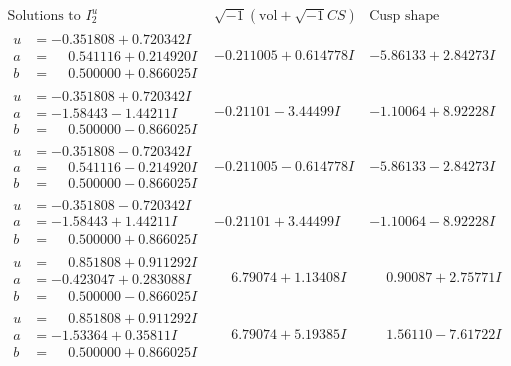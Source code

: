 \documentclass[1p]{elsarticle_modified}
\theoremstyle{definition}
\newcommand{\I}{\sqrt{-1}}
\begin{document}
$$\begin{array}{c|c|c}  
\text{Solutions to }I^u_{2}& \I (\text{vol} + \sqrt{-1}CS) & \text{Cusp shape}\\
 \hline 
\begin{aligned}
u &= -0.351808 + 0.720342 I \\
a &= \phantom{-}0.541116 + 0.214920 I \\
b &= \phantom{-}0.500000 + 0.866025 I\end{aligned}
 & -0.211005 + 0.614778 I & -5.86133 + 2.84273 I \\ \hline\begin{aligned}
u &= -0.351808 + 0.720342 I \\
a &= -1.58443 - 1.44211 I \\
b &= \phantom{-}0.500000 - 0.866025 I\end{aligned}
 & -0.21101 - 3.44499 I & -1.10064 + 8.92228 I \\ \hline\begin{aligned}
u &= -0.351808 - 0.720342 I \\
a &= \phantom{-}0.541116 - 0.214920 I \\
b &= \phantom{-}0.500000 - 0.866025 I\end{aligned}
 & -0.211005 - 0.614778 I & -5.86133 - 2.84273 I \\ \hline\begin{aligned}
u &= -0.351808 - 0.720342 I \\
a &= -1.58443 + 1.44211 I \\
b &= \phantom{-}0.500000 + 0.866025 I\end{aligned}
 & -0.21101 + 3.44499 I & -1.10064 - 8.92228 I \\ \hline\begin{aligned}
u &= \phantom{-}0.851808 + 0.911292 I \\
a &= -0.423047 + 0.283088 I \\
b &= \phantom{-}0.500000 - 0.866025 I\end{aligned}
 & \phantom{-}6.79074 + 1.13408 I & \phantom{-}0.90087 + 2.75771 I \\ \hline\begin{aligned}
u &= \phantom{-}0.851808 + 0.911292 I \\
a &= -1.53364 + 0.35811 I \\
b &= \phantom{-}0.500000 + 0.866025 I\end{aligned}
 & \phantom{-}6.79074 + 5.19385 I & \phantom{-}1.56110 - 7.61722 I \\ \hline\begin{aligned}

\end{aligned}
\end{array}$$
\end{document}
